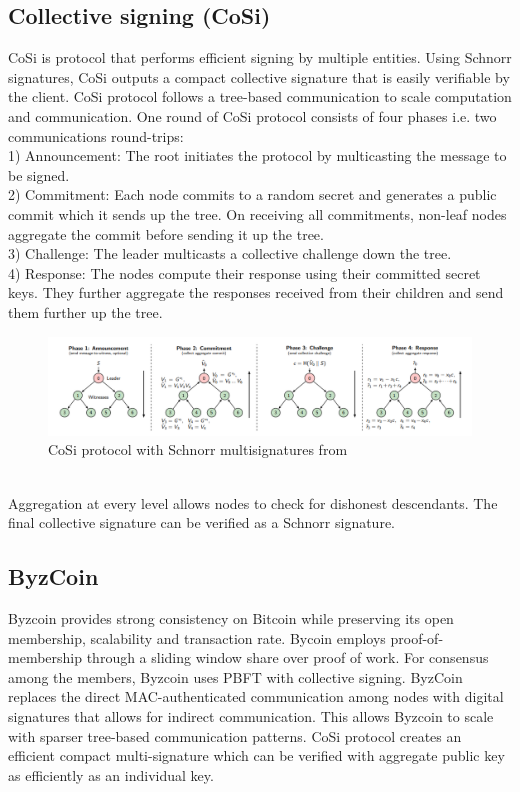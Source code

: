 \subsection{Collective signing (CoSi)}
CoSi is protocol that performs efficient signing by multiple entities. Using Schnorr signatures, CoSi outputs a compact collective signature that is easily verifiable by the client.
CoSi protocol follows a tree-based communication to scale computation and communication. One round of CoSi protocol consists of four phases i.e. two communications round-trips:\\
1) Announcement: The root initiates the protocol by multicasting the message to be signed.\\
2) Commitment: Each node commits to a random secret and generates a public commit which it sends up the tree. On receiving all commitments, non-leaf nodes aggregate the commit before sending it up the tree.\\
3) Challenge: The leader multicasts a collective challenge down the tree.\\
4) Response: The nodes compute their response using their committed secret keys. They further aggregate the responses received from their children and send them further up the tree.
\begin{figure}[h]
	\includegraphics[width=14cm]{cosi.png}
	\caption{CoSi protocol with Schnorr multisignatures from \cite{cosi}}
	\label{cosi}
\end{figure}\\
Aggregation at every level allows nodes to check for dishonest descendants. The final collective signature can be verified as a Schnorr signature. 


\subsection{ByzCoin}
Byzcoin provides strong consistency on Bitcoin while preserving its open membership, scalability and transaction rate. Bycoin employs proof-of-membership through a sliding window share over proof of work. For consensus among the members, Byzcoin uses PBFT with collective signing. ByzCoin replaces the direct MAC-authenticated communication among nodes with digital signatures that allows for indirect communication. This allows Byzcoin to scale with sparser tree-based communication patterns.  CoSi protocol creates an efficient compact multi-signature which can be verified with aggregate public key as efficiently as an individual key.


